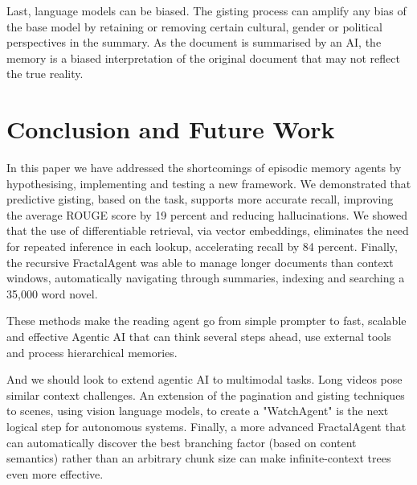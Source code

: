 \documentclass[conference]{IEEEtran}
\begin{document}
Last, language models can be biased. The gisting process can amplify any bias of the base model by retaining or removing certain cultural, gender or political perspectives in the summary. As the document is summarised by an AI, the memory is a biased interpretation of the original document that may not reflect the true reality.

\section{Conclusion and Future Work}
In this paper we have addressed the shortcomings of episodic memory agents by hypothesising, implementing and testing a new framework. We demonstrated that predictive gisting, based on the task, supports more accurate recall, improving the average ROUGE score by 19 percent and reducing hallucinations. We showed that the use of differentiable retrieval, via vector embeddings, eliminates the need for repeated inference in each lookup, accelerating recall by 84 percent. Finally, the recursive FractalAgent was able to manage longer documents than context windows, automatically navigating through summaries, indexing and searching a 35,000 word novel.

These methods make the reading agent go from simple prompter to fast, scalable and effective Agentic AI that can think several steps ahead, use external tools and process hierarchical memories. 

And we should look to extend agentic AI to multimodal tasks. Long videos pose similar context challenges. An extension of the pagination and gisting techniques to scenes, using vision language models, to create a "WatchAgent" is the next logical step for autonomous systems. Finally, a more advanced FractalAgent that can automatically discover the best branching factor (based on content semantics) rather than an arbitrary chunk size can make infinite-context trees even more effective.
\end{document}
